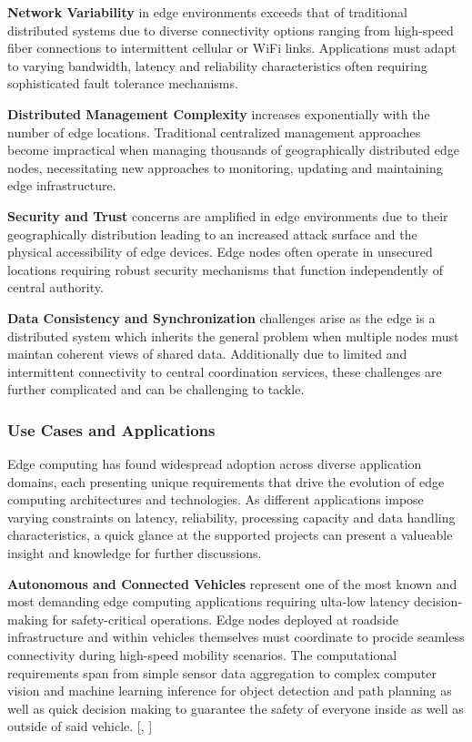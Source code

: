 \textbf{Network Variability} in edge environments exceeds that of traditional distributed systems due to diverse connectivity options ranging from high-speed fiber connections to 
intermittent cellular or WiFi links. 
Applications must adapt to varying bandwidth, latency and reliability characteristics often requiring sophisticated fault tolerance mechanisms.

\textbf{Distributed Management Complexity} increases exponentially with the number of edge locations.
Traditional centralized management approaches become impractical when managing thousands of geographically distributed edge nodes, necessitating new approaches to monitoring, updating and maintaining edge infrastructure.

\textbf{Security and Trust} concerns are amplified in edge environments due to their geographically distribution leading to an increased attack surface and the physical accessibility of edge devices.
Edge nodes often operate in unsecured locations requiring robust security mechanisms that function independently of central authority.

\textbf{Data Consistency and Synchronization} challenges arise as the edge is a distributed system which inherits the general problem 
when multiple nodes must maintan coherent views of shared data. Additionally due to limited and intermittent connectivity to central coordination services, these challenges are further complicated and can be challenging to tackle.


\subsubsection{Use Cases and Applications}
Edge computing has found widespread adoption across diverse application domains, each presenting unique requirements that drive the evolution of edge computing architectures and technologies.
As different applications impose varying constraints on latency, reliability, processing capacity and data handling characteristics, a quick glance at the supported projects can present a valueable insight and knowledge for further discussions.

\textbf{Autonomous and Connected Vehicles} represent one of the most known and most demanding edge computing applications requiring ulta-low latency decision-making for safety-critical operations.
Edge nodes deployed at roadside infrastructure and within vehicles themselves must coordinate to procide seamless connectivity during high-speed mobility scenarios.
The computational requirements span from simple sensor data aggregation to complex computer vision and machine learning inference for object detection and path planning as well as quick decision making to guarantee the safety of everyone inside as well as outside of said vehicle. [\cite{9498627}, \cite{XIE2024}]

